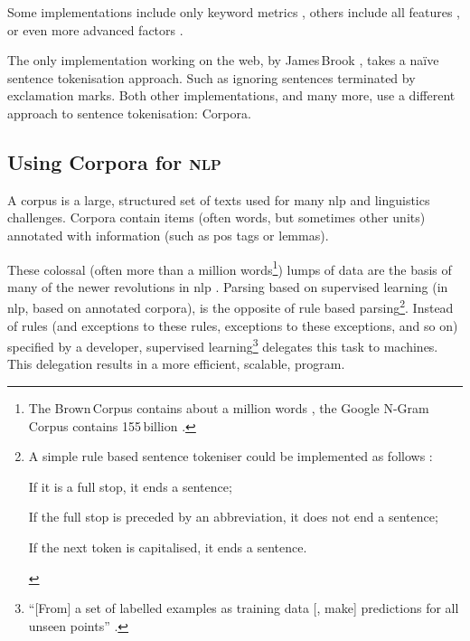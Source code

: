 \noindent Some implementations include only keyword metrics
  \autocite{jbrooksuk/node-summary-source-code}, others include all features
  \autocite{MojoJolo/textteaser-source-code}, or even more advanced factors
  \autocite{summly}.

The only implementation working on the web, by James\,Brook
  \autocite*{jbrooksuk/node-summary-source-code}, takes a na\"ive sentence
  tokenisation approach.
Such as ignoring sentences terminated by exclamation marks.
Both other implementations, and many more, use a different approach to
  sentence tokenisation: Corpora.

\subsection{Using Corpora for \textsc{nlp}}\label{using-corpora-for}

A corpus is a large, structured set of texts used for many \gls{nlp}
  and linguistics challenges.
Corpora contain items (often words, but sometimes other units) annotated
  with information (such as \gls{pos} tags or lemmas).

These colossal (often more than a million words\footnote{The Brown\,Corpus
    contains about a million words \autocite{francis-nelson-brown-corpus},
    the Google N-Gram\,Corpus contains 155\,billion
    \autocite{brants-thorsten-google-ngram-corpus}.})
  lumps of data are the basis of many of the newer revolutions in \gls{nlp}
  \autocite{mitkov-ruslan-ea-importance-corpora}.
Parsing based on supervised learning (in \gls{nlp}, based on annotated
  corpora), is the opposite of rule based parsing\footnote{A simple
    rule based sentence tokeniser could be implemented as follows
    \autocite{attivio.com-doing-things-with-sentences}:

    \begin{aenumerate}
      \item If it is a full stop, it ends a sentence;
      \item If the full stop is preceded by an abbreviation, it does not end
        a sentence;
      \item If the next token is capitalised, it ends a sentence.
    \end{aenumerate}}.
Instead of rules (and exceptions to these rules, exceptions to these
  exceptions, and so on) specified by a developer,
  supervised learning\footnote{``{[}From{]} a set of labelled examples as
    training data {[}, make{]} predictions for all unseen points''
    \autocite{mohri-mehryar-foundations-machine-learning}.}
  delegates this task to machines.
This delegation results in a more efficient, scalable, program.

